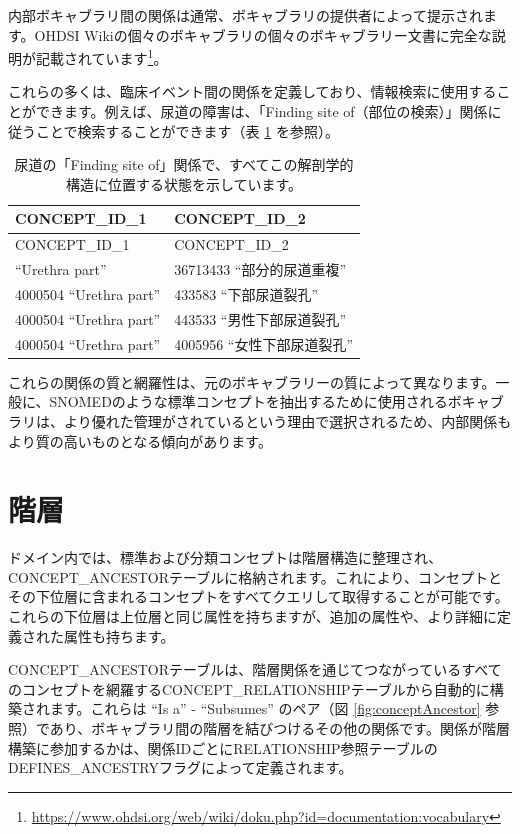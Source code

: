 \documentclass[
  11pt]{book}
\theoremstyle{definition}
\theoremstyle{definition}
\theoremstyle{definition}
\theoremstyle{definition}
\theoremstyle{remark}
\begin{document}
内部ボキャブラリ間の関係は通常、ボキャブラリの提供者によって提示されます。OHDSI Wikiの個々のボキャブラリの個々のボキャブラリー文書に完全な説明が記載されています\footnote{\url{https://www.ohdsi.org/web/wiki/doku.php?id=documentation:vocabulary}}。

これらの多くは、臨床イベント間の関係を定義しており、情報検索に使用することができます。例えば、尿道の障害は、「Finding site of（部位の検索）」関係に従うことで検索することができます（表 \ref{tab:findingSite} を参照）。

\begin{longtable}[]{@{}ll@{}}
\caption{\label{tab:findingSite} 尿道の「Finding site of」関係で、すべてこの解剖学的構造に位置する状態を示しています。}\tabularnewline
\toprule\noalign{}
CONCEPT\_ID\_1 & CONCEPT\_ID\_2 \\
\midrule\noalign{}
\endfirsthead
\toprule\noalign{}
CONCEPT\_ID\_1 & CONCEPT\_ID\_2 \\
\midrule\noalign{}
\endhead
\bottomrule\noalign{}
\endlastfoot
4000504 ``Urethra part'' & 36713433 ``部分的尿道重複'' \\
4000504 ``Urethra part'' & 433583 ``下部尿道裂孔'' \\
4000504 ``Urethra part'' & 443533 ``男性下部尿道裂孔'' \\
4000504 ``Urethra part'' & 4005956 ``女性下部尿道裂孔'' \\
\end{longtable}

これらの関係の質と網羅性は、元のボキャブラリーの質によって異なります。一般に、SNOMEDのような標準コンセプトを抽出するために使用されるボキャブラリは、より優れた管理がされているという理由で選択されるため、内部関係もより質の高いものとなる傾向があります。

\section{階層}\label{conceptAncestor}

ドメイン内では、標準および分類コンセプトは階層構造に整理され、CONCEPT\_ANCESTORテーブルに格納されます。これにより、コンセプトとその下位層に含まれるコンセプトをすべてクエリして取得することが可能です。これらの下位層は上位層と同じ属性を持ちますが、追加の属性や、より詳細に定義された属性も持ちます。

CONCEPT\_ANCESTORテーブルは、階層関係を通じてつながっているすべてのコンセプトを網羅するCONCEPT\_RELATIONSHIPテーブルから自動的に構築されます。これらは ``Is a'' - ``Subsumes'' のペア（図 \ref{fig:conceptAncestor} 参照）であり、ボキャブラリ間の階層を結びつけるその他の関係です。関係が階層構築に参加するかは、関係IDごとにRELATIONSHIP参照テーブルのDEFINES\_ANCESTRYフラグによって定義されます。
\end{document}
